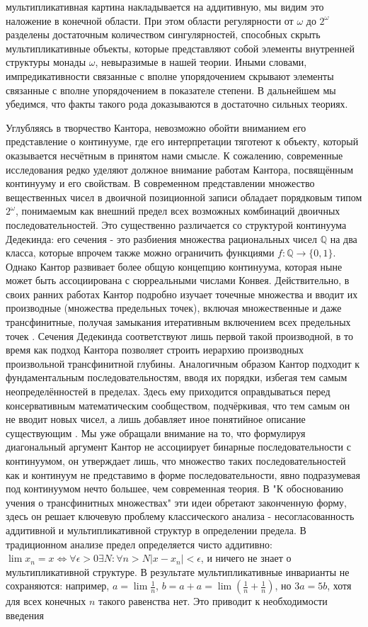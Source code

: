 \documentclass[12pt]{article}
\begin{document}
мультипликативная картина накладывается на аддитивную, мы видим это наложение в конечной области. При этом области регулярности от $\omega$ до $2^\omega$ разделены достаточным количеством сингулярностей, способных скрыть мультипликативные объекты, которые представляют собой элементы внутренней структуры монады $\omega$, невыразимые в нашей теории. Иными словами, импредикативности связанные с вполне упорядочением скрывают элементы связанные с вполне упорядочением в показателе степени. В дальнейшем мы убедимся, что факты такого рода доказываются в достаточно сильных теориях.

Углубляясь в творчество Кантора, невозможно обойти вниманием его представление о континууме, где его интерпретации тяготеют к объекту, который оказывается несчётным в принятом нами смысле. К сожалению, современные исследования редко уделяют должное внимание работам Кантора, посвящённым континууму и его свойствам. В современном представлении множество вещественных чисел в двоичной позиционной записи обладает порядковым типом $2^\omega$, понимаемым как внешний предел всех возможных комбинаций двоичных последовательностей. Это существенно различается со структурой континуума Дедекинда: его сечения - это разбиения множества рациональных чисел $\mathbb{Q}$ на два класса, которые впрочем также можно ограничить функциями $f: \mathbb{Q} \to \{0,1\}$. Однако Кантор развивает более общую концепцию континуума, которая ныне может быть ассоциирована с сюрреальными числами Конвея. Действительно, в своих ранних работах Кантор подробно изучает точечные множества и вводит их производные (множества предельных точек), включая множественные и даже трансфинитные, получая замыкания итеративным включением всех предельных точек \cite{cantor-derivatives}. Сечения Дедекинда соответствуют лишь первой такой производной, в то время как подход Кантора позволяет строить иерархию производных произвольной трансфинитной глубины. Аналогичным образом Кантор подходит к фундаментальным последовательностям, вводя их порядки, избегая тем самым неопределённостей в пределах. Здесь ему приходится оправдываться перед консервативным математическим сообществом, подчёркивая, что тем самым он не вводит новых чисел, а лишь добавляет иное понятийное описание существующим \cite{cantor-sequence-levels}. Мы уже обращали внимание на то, что формулируя диагональный аргумент Кантор не ассоциирует бинарные последовательности с континуумом, он утверждает лишь, что множество таких последовательностей как и континуум не представимо в форме последовательности, явно подразумевая под континуумом нечто большее, чем современная теория. В "К обоснованию учения о трансфинитных множествах" эти идеи обретают законченную форму, здесь он решает ключевую проблему классического анализа - несогласованность аддитивной и мультипликативной структур в определении предела. В традиционном анализе предел определяется чисто аддитивно: $\lim x_n = x \Leftrightarrow \forall \epsilon > 0 \exists N : \forall n > N |x - x_n| < \epsilon$, и ничего не знает о мультипликативной структуре. В результате мультипликативные инварианты не сохраняются: например, $a = \lim \frac{1}{n}$, $b = a + a = \lim (\frac{1}{n} + \frac{1}{n})$, но $3a = 5b$, хотя для всех конечных $n$ такого равенства нет. Это приводит к необходимости введения 
\end{document}

